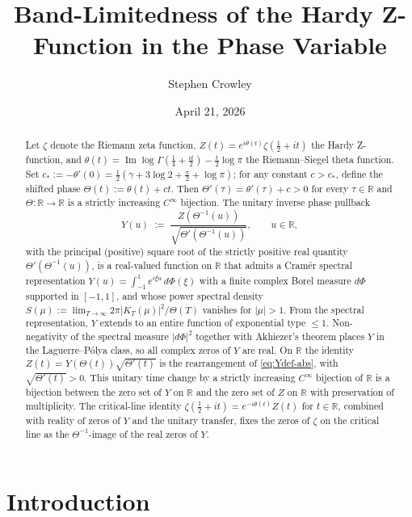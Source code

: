 \documentclass[11pt]{article}
\title{Band-Limitedness of the Hardy Z-Function in the Phase Variable}
\author{Stephen Crowley}
\date{April 21, 2026}
\DeclareMathOperator{\ImOp}{Im}
\let\Im\ImOp
\begin{document}
\maketitle

\begin{abstract}
Let $\zeta$ denote the Riemann zeta function, $Z(t) = e^{i\theta(t)}\zeta(\tfrac{1}{2}+it)$ the Hardy Z-function, and $\theta(t) = \Im\log\Gamma(\tfrac{1}{4}+\tfrac{it}{2}) - \tfrac{t}{2}\log\pi$ the Riemann--Siegel theta function. Set $c_*:=-\theta'(0)=\tfrac{1}{2}(\gamma+3\log 2+\tfrac{\pi}{2}+\log\pi)$; for any constant $c>c_*$, define the shifted phase $\Theta(t):=\theta(t)+ct$. Then $\Theta'(\tau)=\theta'(\tau)+c>0$ for every $\tau\in\mathbb{R}$ and $\Theta:\mathbb{R}\to\mathbb{R}$ is a strictly increasing $C^\infty$ bijection. The unitary inverse phase pullback
\begin{equation}\label{eq:Ydef-abs}
Y(u) \;:=\; \frac{Z(\Theta^{-1}(u))}{\sqrt{\Theta'(\Theta^{-1}(u))}},\qquad u\in\mathbb{R},
\end{equation}
with the principal (positive) square root of the strictly positive real quantity $\Theta'(\Theta^{-1}(u))$, is a real-valued function on $\mathbb{R}$ that admits a Cram\'er spectral representation $Y(u)=\int_{-1}^{1}e^{i\xi u}\,d\Phi(\xi)$ with a finite complex Borel measure $d\Phi$ supported in $[-1,1]$, and whose power spectral density $S(\mu):=\lim_{T\to\infty}2\pi|K_T(\mu)|^2/\Theta(T)$ vanishes for $|\mu|>1$. From the spectral representation, $Y$ extends to an entire function of exponential type $\le 1$. Non-negativity of the spectral measure $|d\Phi|^2$ together with Akhiezer's theorem places $Y$ in the Laguerre--P\'olya class, so all complex zeros of $Y$ are real. On $\mathbb{R}$ the identity $Z(t)=Y(\Theta(t))\sqrt{\Theta'(t)}$ is the rearrangement of \eqref{eq:Ydef-abs}, with $\sqrt{\Theta'(t)}>0$. This unitary time change by a strictly increasing $C^\infty$ bijection of $\mathbb{R}$ is a bijection between the zero set of $Y$ on $\mathbb{R}$ and the zero set of $Z$ on $\mathbb{R}$ with preservation of multiplicity. The critical-line identity $\zeta(\tfrac{1}{2}+it)=e^{-i\theta(t)}Z(t)$ for $t\in\mathbb{R}$, combined with reality of zeros of $Y$ and the unitary transfer, fixes the zeros of $\zeta$ on the critical line as the $\Theta^{-1}$-image of the real zeros of $Y$.
\end{abstract}

\section{Introduction}
\end{document}
